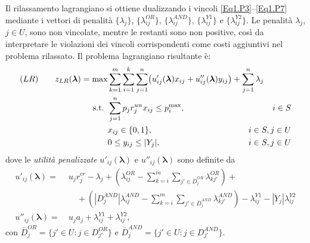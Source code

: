 \documentclass[12pt,a4paper,openright,twoside]{book}
\begin{document}
Il rilassamento lagrangiano si ottiene dualizzando i vincoli \eqref{Eq1.P3}–\eqref{Eq1.P7} mediante i vettori di penalità $\{\lambda_j\}$, $\{\lambda^{OR}_{ij}\}$, $\{\lambda^{AND}_{ij}\}$, $\{\lambda^{Y1}_{ij}\}$ e $\{\lambda^{Y2}_{ij}\}$. Le penalità $\lambda_j$, $j \in U$, sono non vincolate, mentre le restanti sono non positive, così da interpretare le violazioni dei vincoli corrispondenti come costi aggiuntivi nel problema rilassato. Il problema lagrangiano risultante è:
\begin{alignat}{3}
(LR) \qquad z_{LR}(\boldsymbol{\lambda}) = \max  & \sum_{k=1}^m \sum_{i=1}^{k} \sum_{j=1}^{n} \bigl(u'_{ij}(\boldsymbol{\lambda}) x_{ij} + u''_{ij}(\boldsymbol{\lambda}) y_{ij}\bigr)
                                         + \sum_{j=1}^{n} \lambda_j            & \hspace{-1.0cm}                   \label{Eq1.LR1}\\
  \text{s.t. } & \sum_{j=1}^{n} p_j r_j^{un} x_{ij} \leq p_i^{\max},                   & \hspace{-1.0cm} i \in S           \label{Eq1.LR2}\\
        & x_{ij} \in \{0,1\},                                                  & \hspace{-1.0cm} i \in S, j \in U  \label{Eq1.LR8}\\
        & 0 \leq y_{ij} \leq |Y_j|,                                            & \hspace{-1.0cm} i \in S, j \in U  \label{Eq1.LR9}
\end{alignat}
dove le \emph{utilità penalizzate} $u'_{ij}(\boldsymbol{\lambda})$ e $u''_{ij}(\boldsymbol{\lambda})$ sono definite da
\begin{equation}
\begin{split}
u'_{ij}(\boldsymbol{\lambda}) = &\ u_{j} r_j^{cr} - \lambda_j
                            + \left( \lambda^{OR}_{ij} - \sum_{k=i}^{m}\sum_{j' \in \bar{D}^{OR}_j} \lambda^{OR}_{kj'} \right) + \\
          &\quad\ + \left( |D^{AND}_j|\lambda^{AND}_{ij} - \sum_{k=i}^{m}\sum_{j' \in \bar{D}^{AND}_j} \lambda^{AND}_{kj'} \right)
                            - \lambda^{Y1}_{ij} - |Y_j|\lambda^{Y2}_{ij} \\
u''_{ij}(\boldsymbol{\lambda}) = &\ u_{j} a_j + \lambda^{Y1}_{ij} + \lambda^{Y2}_{ij},
\end{split}
\label{Eq.PU}
\end{equation}
con $\bar{D}^{OR}_j = \{j' \in U : j \in D^{OR}_{j'}\}$ e $\bar{D}^{AND}_j = \{j' \in U : j \in D^{AND}_{j'}\}$.
\end{document}
